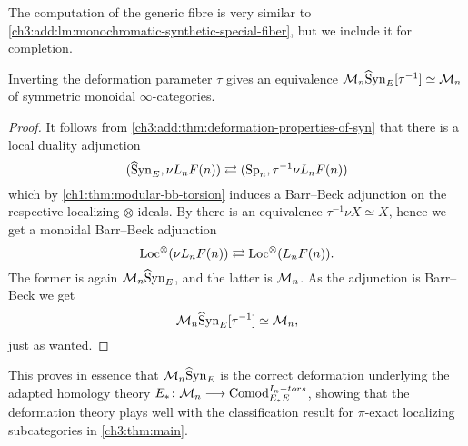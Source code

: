 The computation of the generic fibre is very similar to \cref{ch3:add:lm:monochromatic-synthetic-special-fiber}, but we include it for completion. 

\begin{theorem}
    Inverting the deformation parameter $\tau$ gives an equivalence $\mathcal{M}_{n}\widehat{\mathrm{S}}\mathrm{yn}_{E}[\tau^{-1}] \simeq \mathcal{M}_{n}$ of symmetric monoidal $\infty$-categories. 
\end{theorem}
\begin{proof}
    It follows from \cref{ch3:add:thm:deformation-properties-of-syn} that there is a local duality adjunction 
    \[(\widehat{\mathrm{S}}\mathrm{yn}_{E}, \nu L_n F(n)) \rightleftarrows (\mathrm{Sp}_n, \tau^{-1}\nu L_n F(n))\]
    which by \cref{ch1:thm:modular-bb-torsion} induces a Barr--Beck adjunction on the respective localizing $\otimes$-ideals. By \cite[4.40]{pstragowski_2022} there is an equivalence $\tau^{-1}\nu X \simeq X$, hence we get a monoidal Barr--Beck adjunction 
    \[\operatorname{Loc}^\otimes(\nu L_n F(n))\rightleftarrows \operatorname{Loc}^\otimes(L_n F(n)).\]
    The former is again $\mathcal{M}_{n}\widehat{\mathrm{S}}\mathrm{yn}_{E}$, and the latter is $\mathcal{M}_{n}$. As the adjunction is Barr--Beck we get 
    \[\mathcal{M}_{n}\widehat{\mathrm{S}}\mathrm{yn}_{E}[\tau^{-1}]\simeq \mathcal{M}_{n},\]
    just as wanted. 
\end{proof}

This proves in essence that $\mathcal{M}_{n}\widehat{\mathrm{S}}\mathrm{yn}_{E}$ is the correct deformation underlying the adapted homology theory $E_*\colon \mathcal{M}_{n}\longrightarrow \mathrm{Comod}_{E_*E}^{I_n-tors}$, showing that the deformation theory plays well with the classification result for $\pi$-exact localizing subcategories in \cref{ch3:thm:main}. 






